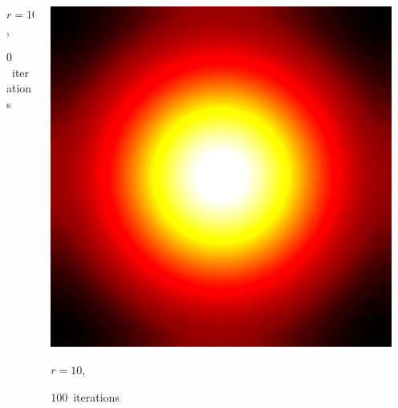 \documentclass[aspectratio=169,t]{beamer}
\begin{document}
{\begin{columns}
\begin{column}{0.22\textwidth}
			{\footnotesize 
				\par \vspace{-1mm} $r=10$, 
				\par \vspace{-1mm} $0$~iterations
			}
		\end{column}
		\begin{column}{0.22\textwidth}
			\centering
			\includegraphics[width=.85\textwidth]{data/synthetic_meshes/square_tesselation_4tri_Dirac_delta_10_v841_f1600_funcvals_100iter.png}
			{\footnotesize 
				\par \vspace{-1mm} $r=10$, 
				\par \vspace{-1mm} $100$~iterations
			}
		\end{column}
		\begin{column}{0.17\textwidth}~\end{column}
	\end{columns}
}
\end{document}
